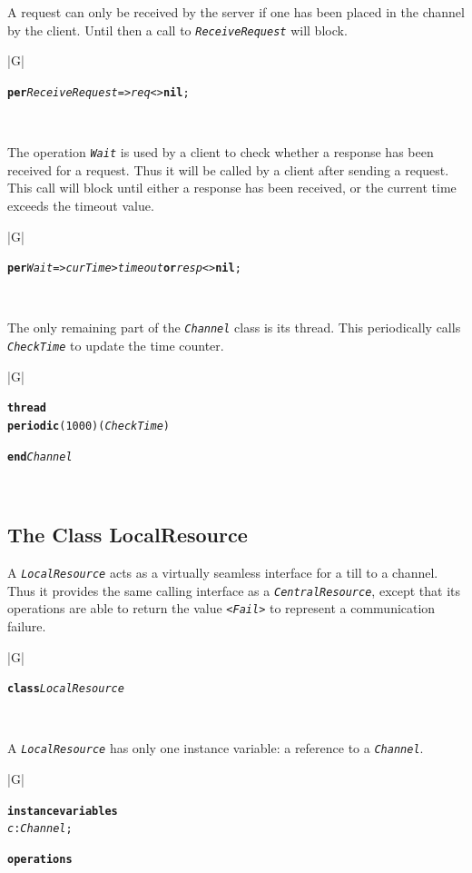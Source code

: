 \documentclass[\pformat,12pt,twoside]{article}
\newenvironment{VDMgray}%
{\begin{tabular}{|G|}\hline\small\begin{alltt}}%
{\end{alltt}\normalsize\\
 \hline\end{tabular}}
\begin{document}
A request can only be received by the server if one has been placed in
the channel by the client. Until then a call to
\texttt{\emph{ReceiveRequest}} will block.

\begin{VDMgray}
 \textbf{per} \textit{ReceiveRequest} =\texttt{>} \textit{req} \texttt{<}\texttt{>} \textbf{nil};
\end{VDMgray}


The operation \texttt{\emph{Wait}} is used by a client to check
whether a response has been received for a request. Thus it will be
called by a client after sending a request. This call will block until
either a response has been received, or the current time exceeds the
timeout value.

\begin{VDMgray}
 \textbf{per} \textit{Wait} =\texttt{>} \textit{curTime} \texttt{>} \textit{timeout} \textbf{or} \textit{resp} \texttt{<}\texttt{>} \textbf{nil};
\end{VDMgray}


The only remaining part of the \texttt{\emph{Channel}} class is its
thread. This periodically calls \texttt{\emph{CheckTime}} to update
the time counter.

\begin{VDMgray}
\textbf{thread}
 \textbf{periodic}(1000)(\textit{CheckTime})

\textbf{end} \textit{Channel}
\end{VDMgray}


\subsection{The Class LocalResource}


A \texttt{\emph{LocalResource}} acts as a virtually seamless interface
for a till to a channel. Thus it provides the same calling interface
as a \texttt{\emph{CentralResource}}, except that its operations are
able to return the value \texttt{<}\texttt{\emph{Fail}}\texttt{>} to
represent a communication failure.

\begin{VDMgray}
\textbf{class} \textit{LocalResource}
\end{VDMgray}


A \texttt{\emph{LocalResource}} has only one instance variable: a reference to 
a \texttt{\emph{Channel}}.

\begin{VDMgray}
\textbf{instance} \textbf{variables}
 \textit{c} : \textit{Channel};

\textbf{operations}
\end{VDMgray}
\end{document}
